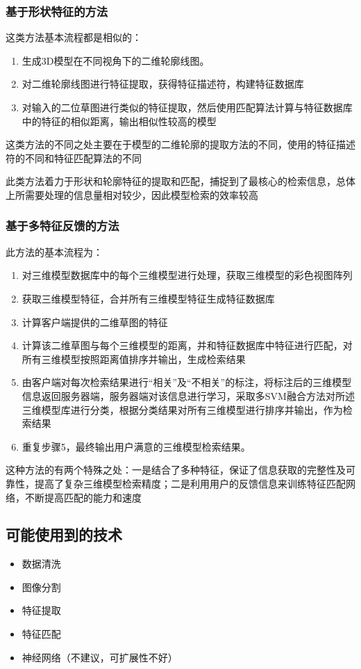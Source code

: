\documentclass{article}
\begin{document}
\subsubsection{基于形状特征的方法}
这类方法基本流程都是相似的：
\begin{enumerate}
    \item 生成3D模型在不同视角下的二维轮廓线图。
    \item 对二维轮廓线图进行特征提取，获得特征描述符，构建特征数据库
    \item 对输入的二位草图进行类似的特征提取，然后使用匹配算法计算与特征数据库中的特征的相似距离，输出相似性较高的模型
\end{enumerate}
   
这类方法的不同之处主要在于模型的二维轮廓的提取方法的不同，使用的特征描述符的不同和特征匹配算法的不同

此类方法着力于形状和轮廓特征的提取和匹配，捕捉到了最核心的检索信息，总体上所需要处理的信息量相对较少，因此模型检索的效率较高
\subsubsection{基于多特征反馈的方法}
此方法的基本流程为：
\begin{enumerate}
    \item 对三维模型数据库中的每个三维模型进行处理，获取三维模型的彩色视图阵列
    \item 获取三维模型特征，合并所有三维模型特征生成特征数据库
    \item 计算客户端提供的二维草图的特征
    \item 计算该二维草图与每个三维模型的距离，并和特征数据库中特征进行匹配，对所有三维模型按照距离值排序并输出，生成检索结果
    \item 由客户端对每次检索结果进行“相关”及“不相关”的标注，将标注后的三维模型信息返回服务器端，服务器端对该信息进行学习，采取多SVM融合方法对所述三维模型库进行分类，根据分类结果对所有三维模型进行排序并输出，作为检索结果
    \item 重复步骤5，最终输出用户满意的三维模型检索结果。
\end{enumerate}

这种方法的有两个特殊之处：一是结合了多种特征，保证了信息获取的完整性及可靠性，提高了复杂三维模型检索精度；二是利用用户的反馈信息来训练特征匹配网络，不断提高匹配的能力和速度
\subsection{可能使用到的技术}
\begin{itemize}
    \item 数据清洗
    \item 图像分割
    \item 特征提取
    \item 特征匹配
    \item 神经网络（不建议，可扩展性不好）
\end{itemize}
\end{document}
